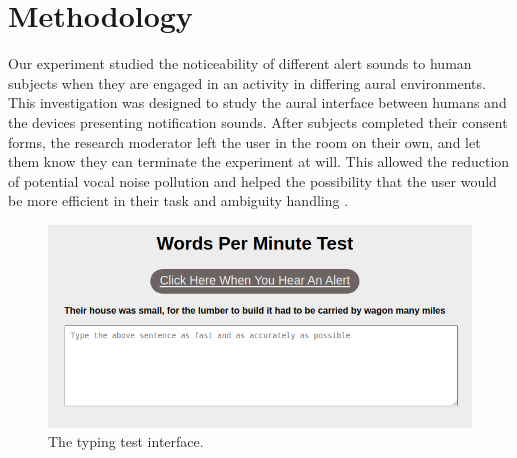 \documentclass[manuscript,screen,review]{acmart}
\begin{document}

\section{Methodology}
Our experiment studied the noticeability of different alert sounds to human subjects when they are engaged in an activity in differing aural environments. This investigation was designed to study the aural interface between humans and the devices presenting notification sounds. After subjects completed their consent forms, the research moderator left the user in the room on their own, and let them know they can terminate the experiment at will. This allowed the reduction of potential vocal noise pollution and helped the possibility that the user would be more efficient in their task and ambiguity handling \cite{638249.638285}.

\begin{figure}[h]
  \centering
  \includegraphics[scale=0.5]{images/wpm-test.png}
  \caption{The typing test interface.}
\end{figure}
\end{document}
